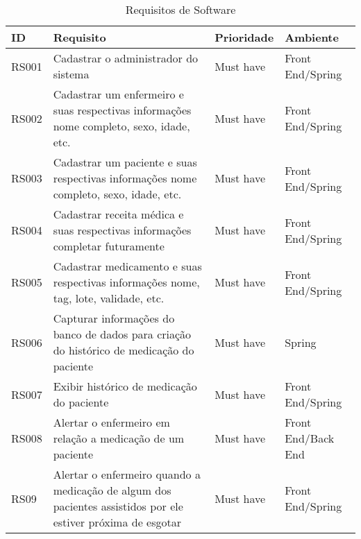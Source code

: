 \begin{table}[H]
    \centering
    \caption{Requisitos de Software}
	\begin{adjustbox}{max width = \textwidth}
        \begin{tabular}{|L{1.5cm}|L{8.5cm}|C{2.5cm}|C{3.5cm}|}
        \hline
        \textbf{ID} & \textbf{Requisito} & \textbf{Prioridade} & \textbf{Ambiente} \\
        \hline
        RS001 & Cadastrar o administrador do sistema & Must have & Front End/Spring\\ 
        \hline
        RS002 & Cadastrar um enfermeiro e suas respectivas informações {nome completo, sexo, idade, etc.} & Must have & Front End/Spring \\
        \hline
        RS003 & Cadastrar um paciente e suas respectivas informações {nome completo, sexo, idade, etc.} & Must have & Front End/Spring \\ 
        \hline
        RS004 & Cadastrar receita médica e suas respectivas informações {completar futuramente} & Must have & Front End/Spring \\ 
        \hline
        RS005 & Cadastrar medicamento e suas respectivas informações {nome, tag, lote, validade, etc.} & Must have & Front End/Spring \\ 
        \hline
        RS006 & Capturar informações do banco de dados para criação do histórico de medicação do paciente & Must have & Spring \\
        \hline
        RS007 & Exibir histórico de medicação do paciente & Must have & Front End/Spring \\
        \hline
        RS008 & Alertar o enfermeiro em relação a medicação de um paciente & Must have & Front End/Back End \\ 
        \hline
        RS09 & Alertar o enfermeiro quando a medicação de algum dos pacientes assistidos por ele estiver próxima de esgotar & Must have & Front End/Spring \\
        \hline

\end{tabular}
\end{adjustbox}
\end{table}

